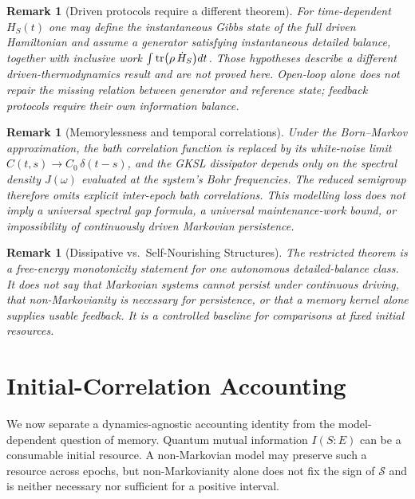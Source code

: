 \documentclass[12pt,a4paper,openany]{book}
\newtheorem{remark}[theorem]{Remark}
\begin{document}
\begin{remark}[Driven protocols require a different theorem]
\label{I-rem:driven_protocol}
For time-dependent $H_S(t)$ one may define the instantaneous Gibbs
state of the full driven Hamiltonian and assume a generator satisfying
instantaneous detailed balance, together with inclusive work
$\int\tr(\rho\,\dot H_S)dt$.  Those hypotheses describe a different
driven-thermodynamics result and are not proved here.  Open-loop alone
does not repair the missing relation between generator and reference
state; feedback protocols require their own information balance.
\end{remark}

\begin{remark}[Memorylessness and temporal correlations]
\label{I-rem:temporal_blindness}
Under the Born--Markov approximation, the bath correlation
function is replaced by its white-noise limit
$C(t,s) \to C_0\,\delta(t-s)$, and the GKSL dissipator depends
only on the spectral density $J(\omega)$ evaluated at the
system's Bohr frequencies.
The reduced semigroup therefore omits explicit inter-epoch bath
correlations.  This modelling loss does not imply a universal spectral
gap formula, a universal maintenance-work bound, or impossibility of
continuously driven Markovian persistence.
\end{remark}

\begin{remark}[Dissipative vs.\ Self-Nourishing Structures]
\label{I-rem:ceiling_physics}
The restricted theorem is a free-energy monotonicity statement for one
autonomous detailed-balance class.  It does not say that Markovian
systems cannot persist under continuous driving, that non-Markovianity
is necessary for persistence, or that a memory kernel alone supplies
usable feedback.  It is a controlled baseline for comparisons at fixed
initial resources.
\end{remark}

\section{Initial-Correlation Accounting}
\label{I-sec:advantage}

We now separate a dynamics-agnostic accounting identity from the
model-dependent question of memory.  Quantum mutual information
$I(S{:}E)$ can be a consumable initial resource.  A non-Markovian model
may preserve such a resource across epochs, but non-Markovianity alone
does not fix the sign of $\mathcal S$ and is neither necessary nor
sufficient for a positive interval.
\end{document}
